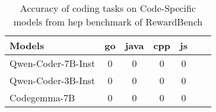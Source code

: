 \begin{table}[h!]
    \centering
    \renewcommand{\arraystretch}{1.3} %
    \begin{tabular}{|l|c|c|c|c|c|c|}
        \hline
        \textbf{Models} & \textbf{go} & \textbf{java} & \textbf{cpp} & \textbf{js} \\
        \hline
        Qwen-Coder-7B-Inst & 0 & 0 & 0 & 0  \\ \hline
        Qwen-Coder-3B-Inst & 0 & 0 & 0 & 0 \\ \hline
        Codegemma-7B & 0 & 0 & 0 & 0 \\
        \hline
    \end{tabular}
    \caption{Accuracy of coding tasks on Code-Specific models from hep benchmark of RewardBench}
    \label{tab:model_accuracy}
\end{table}
